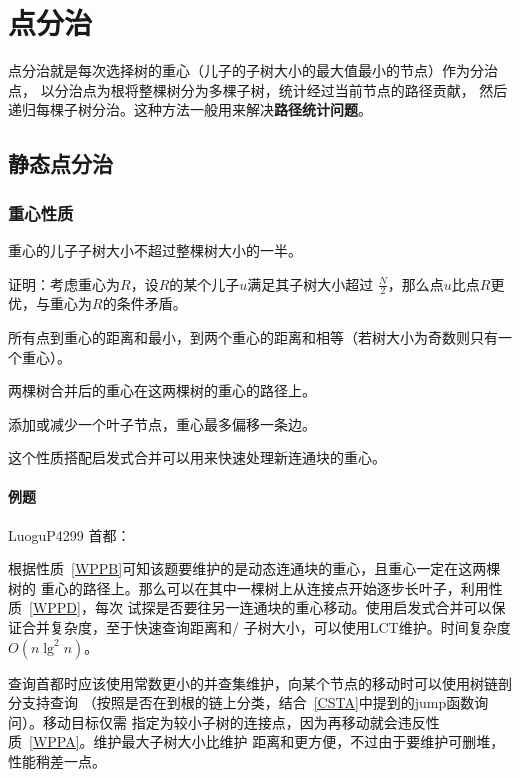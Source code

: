 \section{点分治}
点分治就是每次选择树的重心（儿子的子树大小的最大值最小的节点）作为分治点，
以分治点为根将整棵树分为多棵子树，统计经过当前节点的路径贡献，
然后递归每棵子树分治。这种方法一般用来解决{\bfseries 路径统计问题}。
\subsection{静态点分治}
\subsubsection{重心性质}
\begin{property}\label{WPPA}
    重心的儿子子树大小不超过整棵树大小的一半。
\end{property}
证明：考虑重心为$R$，设$R$的某个儿子$u$满足其子树大小超过
$\frac{N}{2}$，那么点$u$比点$R$更优，与重心为$R$的条件矛盾。
\begin{property}\label{WPPB}
    所有点到重心的距离和最小，到两个重心的距离和相等（若树大小为奇数则只有一个重心）。
\end{property}
\begin{property}\label{WPPC}
    两棵树合并后的重心在这两棵树的重心的路径上。
\end{property}
\begin{property}\label{WPPD}
    添加或减少一个叶子节点，重心最多偏移一条边。
\end{property}

这个性质搭配启发式合并可以用来快速处理新连通块的重心。

\paragraph{例题} LuoguP4299 首都：

根据性质~\ref{WPPB}可知该题要维护的是动态连通块的重心，且重心一定在这两棵树的
重心的路径上。那么可以在其中一棵树上从连接点开始逐步长叶子，利用性质~\ref{WPPD}，每次
试探是否要往另一连通块的重心移动。使用启发式合并可以保证合并复杂度，至于快速查询距离和/
子树大小，可以使用LCT维护。时间复杂度$O(n\lg^2n)$。

查询首都时应该使用常数更小的并查集维护，向某个节点的移动时可以使用树链剖分支持查询
（按照是否在到根的链上分类，结合~\ref{CSTA}中提到的jump函数询问）。移动目标仅需
指定为较小子树的连接点，因为再移动就会违反性质~\ref{WPPA}。维护最大子树大小比维护
距离和更方便，不过由于要维护可删堆，性能稍差一点。

